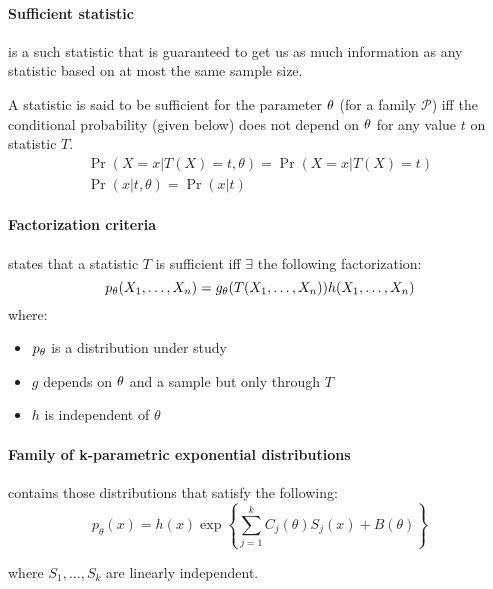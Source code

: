 \paragraph{Sufficient statistic}
is a such statistic that is guaranteed to get us as much information as any statistic based on at
most the same sample size.

A statistic is said to be sufficient for the parameter $\theta$ (for a family $\mathcal{P}$) iff the
conditional probability (given below) does not depend on $\theta$ for any value $t$ on statistic
$T$.
\begin{gather*}
\Pr(X=x|T(X)=t,\theta) = \Pr(X=x|T(X)=t)\\
\Pr(x|t,\theta) = \Pr(x|t)
\end{gather*}


\paragraph{Factorization criteria}
states that a statistic $T$ is sufficient iff $\exists$ the following factorization:
\[ p_\theta(X_{1}, \ldots, X_{n}) = g_\theta(T(X_{1}, \ldots, X_{n})) h(X_{1}, \ldots, X_{n}) \]
\noindent where:
\begin{itemize}[noitemsep,nolistsep]
  \item $p_\theta$ is a distribution under study
  
  \item $g$ depends on $\theta$ and a sample but only through $T$
  
  \item $h$ is independent of $\theta$
\end{itemize}

\paragraph{Family of k-parametric exponential distributions}
contains those distributions that satisfy the following:
\[ p_\theta(x) = h(x) \exp{ \left\{ \sum_{j=1}^k C_j(\theta)S_j(x) + B(\theta) \right\}  } \]

where $S_1, \ldots, S_k$ are linearly independent.
